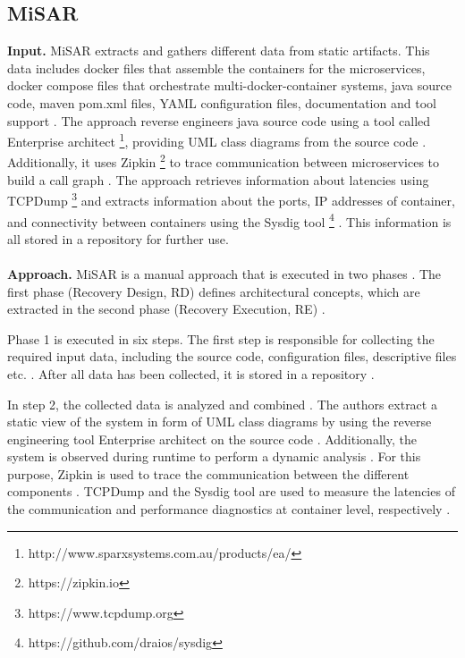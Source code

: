 \subsection{MiSAR}
\label{sec:Results:MiSAR}
\textbf{Input.}
MiSAR extracts and gathers different data from static artifacts.
This data includes docker files that assemble the containers for the microservices, docker compose files that orchestrate multi-docker-container systems, java source code, maven pom.xml files, YAML configuration files, documentation and tool support \cite{Alshuqayran2018MiSAR}.
The approach reverse engineers java source code using a tool called Enterprise architect \footnote{http://www.sparxsystems.com.au/products/ea/}, providing UML class diagrams from the source code \cite{Alshuqayran2018MiSAR}.
Additionally, it uses Zipkin \footnote{https://zipkin.io} to trace communication between microservices to build a call graph \cite{Alshuqayran2018MiSAR}.
The approach retrieves information about latencies using TCPDump \footnote{https://www.tcpdump.org} and extracts information about the ports, IP addresses of container, and connectivity between containers using the Sysdig tool \footnote{https://github.com/draios/sysdig} \cite{Alshuqayran2018MiSAR}.
This information is all stored in a repository for further use.
\\ \\
\textbf{Approach.}
MiSAR is a manual approach that is executed in two phases \cite{Alshuqayran2018MiSAR}.
The first phase (Recovery Design, RD) defines architectural concepts, which are extracted in the second phase (Recovery Execution, RE) \cite{Alshuqayran2018MiSAR}.

Phase 1 is executed in six steps.
The first step is responsible for collecting the required input data, including the source code, configuration files, descriptive files etc. \cite{Alshuqayran2018MiSAR}.
After all data has been collected, it is stored in a repository \cite{Alshuqayran2018MiSAR}.

In step 2, the collected data is analyzed and combined \cite{Alshuqayran2018MiSAR}.
The authors extract a static view of the system in form of UML class diagrams by using the reverse engineering tool Enterprise architect on the source code \cite{Alshuqayran2018MiSAR}.
Additionally, the system is observed during runtime to perform a dynamic analysis \cite{Alshuqayran2018MiSAR}.
For this purpose, Zipkin is used to trace the communication between the different components \cite{Alshuqayran2018MiSAR}.
TCPDump and the Sysdig tool are used to measure the latencies of the communication and performance diagnostics at container level, respectively \cite{Alshuqayran2018MiSAR}.

